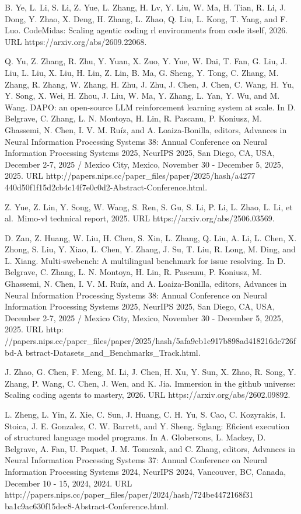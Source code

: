 \documentclass[
  10
]{article}
\begin{document}
B. Ye, L. Li, S. Li, Z. Yue, L. Zhang, H. Lv, Y. Liu, W. Ma, H. Tian, R.
Li, J. Dong, Y. Zhao, X. Deng, H. Zhang, L. Zhao, Q. Liu, L. Kong, T.
Yang, and F. Luo. CodeMidas: Scaling agentic coding rl environments from
code itself, 2026. URL https://arxiv.org/abs/2609.22068.

Q. Yu, Z. Zhang, R. Zhu, Y. Yuan, X. Zuo, Y. Yue, W. Dai, T. Fan, G.
Liu, J. Liu, L. Liu, X. Liu, H. Lin, Z. Lin, B. Ma, G. Sheng, Y. Tong,
C. Zhang, M. Zhang, R. Zhang, W. Zhang, H. Zhu, J. Zhu, J. Chen, J.
Chen, C. Wang, H. Yu, Y. Song, X. Wei, H. Zhou, J. Liu, W. Ma, Y. Zhang,
L. Yan, Y. Wu, and M. Wang. DAPO: an open-source LLM reinforcement
learning system at scale. In D. Belgrave, C. Zhang, L. N. Montoya, H.
Lin, R. Pascanu, P. Koniusz, M. Ghassemi, N. Chen, I. V. M. Ruíz, and A.
Loaiza-Bonilla, editors, Advances in Neural Information Processing
Systems 38: Annual Conference on Neural Information Processing Systems
2025, NeurIPS 2025, San Diego, CA, USA, December 2-7, 2025 / Mexico
City, Mexico, November 30 - December 5, 2025, 2025. URL
http://papers.nips.cc/paper\_files/paper/2025/hash/a4277
440d50f1f15d2cb4c14f7e0c0d2-Abstract-Conference.html.

Z. Yue, Z. Lin, Y. Song, W. Wang, S. Ren, S. Gu, S. Li, P. Li, L. Zhao,
L. Li, et al.~Mimo-vl technical report, 2025. URL
https://arxiv.org/abs/2506.03569.

D. Zan, Z. Huang, W. Liu, H. Chen, S. Xin, L. Zhang, Q. Liu, A. Li, L.
Chen, X. Zhong, S. Liu, Y. Xiao, L. Chen, Y. Zhang, J. Su, T. Liu, R.
Long, M. Ding, and L. Xiang. Multi-swebench: A multilingual benchmark
for issue resolving. In D. Belgrave, C. Zhang, L. N. Montoya, H. Lin, R.
Pascanu, P. Koniusz, M. Ghassemi, N. Chen, I. V. M. Ruíz, and A.
Loaiza-Bonilla, editors, Advances in Neural Information Processing
Systems 38: Annual Conference on Neural Information Processing Systems
2025, NeurIPS 2025, San Diego, CA, USA, December 2-7, 2025 / Mexico
City, Mexico, November 30 - December 5, 2025, 2025. URL http:
//papers.nips.cc/paper\_files/paper/2025/hash/5afa9cb1e917b898ad418216dc726fbd-A
bstract-Datasets\_and\_Benchmarks\_Track.html.

J. Zhao, G. Chen, F. Meng, M. Li, J. Chen, H. Xu, Y. Sun, X. Zhao, R.
Song, Y. Zhang, P. Wang, C. Chen, J. Wen, and K. Jia. Immersion in the
github universe: Scaling coding agents to mastery, 2026. URL
https://arxiv.org/abs/2602.09892.

L. Zheng, L. Yin, Z. Xie, C. Sun, J. Huang, C. H. Yu, S. Cao, C.
Kozyrakis, I. Stoica, J. E. Gonzalez, C. W. Barrett, and Y. Sheng.
Sglang: Eficient execution of structured language model programs. In A.
Globersons, L. Mackey, D. Belgrave, A. Fan, U. Paquet, J. M. Tomczak,
and C. Zhang, editors, Advances in Neural Information Processing Systems
37: Annual Conference on Neural Information Processing Systems 2024,
NeurIPS 2024, Vancouver, BC, Canada, December 10 - 15, 2024, 2024. URL
http://papers.nips.cc/paper\_files/paper/2024/hash/724be4472168f31
ba1c9ac630f15dec8-Abstract-Conference.html.
\end{document}
